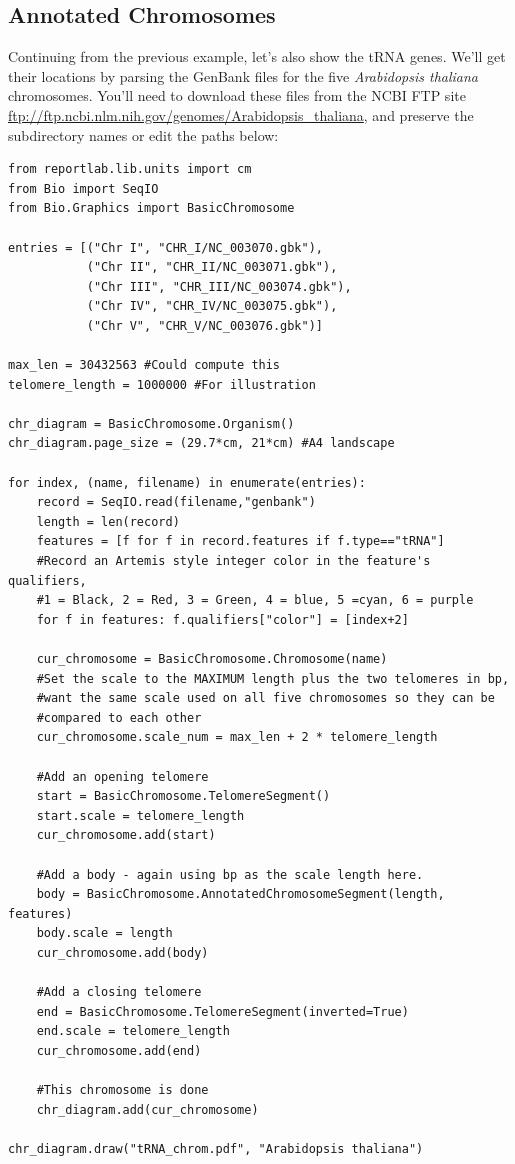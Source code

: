 \documentclass{report}
\begin{document}
\subsection{Annotated Chromosomes}

Continuing from the previous example, let's also show the tRNA genes.
We'll get their locations by parsing the GenBank files for the five
\textit{Arabidopsis thaliana} chromosomes. You'll need to download these
files from the NCBI FTP site
\url{ftp://ftp.ncbi.nlm.nih.gov/genomes/Arabidopsis_thaliana},
and preserve the subdirectory names or edit the paths below:

\begin{verbatim}
from reportlab.lib.units import cm
from Bio import SeqIO
from Bio.Graphics import BasicChromosome

entries = [("Chr I", "CHR_I/NC_003070.gbk"),
           ("Chr II", "CHR_II/NC_003071.gbk"),
           ("Chr III", "CHR_III/NC_003074.gbk"),
           ("Chr IV", "CHR_IV/NC_003075.gbk"),
           ("Chr V", "CHR_V/NC_003076.gbk")]

max_len = 30432563 #Could compute this
telomere_length = 1000000 #For illustration

chr_diagram = BasicChromosome.Organism()
chr_diagram.page_size = (29.7*cm, 21*cm) #A4 landscape

for index, (name, filename) in enumerate(entries):
    record = SeqIO.read(filename,"genbank")
    length = len(record)
    features = [f for f in record.features if f.type=="tRNA"]
    #Record an Artemis style integer color in the feature's qualifiers,
    #1 = Black, 2 = Red, 3 = Green, 4 = blue, 5 =cyan, 6 = purple 
    for f in features: f.qualifiers["color"] = [index+2]

    cur_chromosome = BasicChromosome.Chromosome(name)
    #Set the scale to the MAXIMUM length plus the two telomeres in bp,
    #want the same scale used on all five chromosomes so they can be
    #compared to each other
    cur_chromosome.scale_num = max_len + 2 * telomere_length

    #Add an opening telomere
    start = BasicChromosome.TelomereSegment()
    start.scale = telomere_length
    cur_chromosome.add(start)

    #Add a body - again using bp as the scale length here.
    body = BasicChromosome.AnnotatedChromosomeSegment(length, features)
    body.scale = length
    cur_chromosome.add(body)

    #Add a closing telomere
    end = BasicChromosome.TelomereSegment(inverted=True)
    end.scale = telomere_length
    cur_chromosome.add(end)

    #This chromosome is done
    chr_diagram.add(cur_chromosome)

chr_diagram.draw("tRNA_chrom.pdf", "Arabidopsis thaliana")
\end{verbatim}
\end{document}
